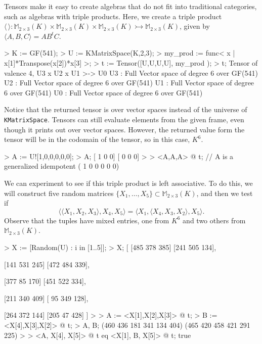 \begin{example}[BBTripleProduct]
Tensors make it easy to create algebras that do not fit into traditional categories, such as algebras with triple products.
Here, we create a triple product $\langle \,\rangle : \mathbb{M}_{2\times 3}(K)\times \mathbb{M}_{2\times 3}(K)\times\mathbb{M}_{2\times 3}(K)\rightarrowtail \mathbb{M}_{2\times 3}(K)$, given by $\langle A, B, C\rangle = AB^tC$.

\begin{code}
> K := GF(541);
> U := KMatrixSpace(K,2,3);
> my_prod := func< x | x[1]*Transpose(x[2])*x[3] >;
> t := Tensor([U,U,U,U], my_prod );
> t;
Tensor of valence 4, U3 x U2 x U1 >-> U0
U3 : Full Vector space of degree 6 over GF(541)
U2 : Full Vector space of degree 6 over GF(541)
U1 : Full Vector space of degree 6 over GF(541)
U0 : Full Vector space of degree 6 over GF(541)
\end{code}

Notice that the returned tensor is over vector spaces instead of the universe of \texttt{KMatrixSpace}.
Tensors can still evaluate elements from the given frame, even though it prints out over vector spaces. 
However, the returned value form the tensor will be in the codomain of the tensor, so in this case, $K^6$.
\begin{code}
> A := U![1,0,0,0,0,0];
> A;
[  1   0   0]
[  0   0   0]
> 
> <A,A,A> @ t;  // A is a generalized idempotent
(  1   0   0   0   0   0)
\end{code}

We can experiment to see if this triple product is left associative.
To do this, we will construct five random matrices $\{ X_1,\dots,X_5\}\subset \mathbb{M}_{2\times 3}(K)$, and then we test if 
\[ \langle \langle X_1, X_2, X_3 \rangle, X_4, X_5\rangle = \langle X_1, \langle X_4, X_3, X_2\rangle, X_5\rangle. \]
Observe that the tuples have mixed entries, one from $K^6$ and two others from $\mathbb{M}_{2\times 3}(K)$. 

\begin{code}
> X := [Random(U) : i  in [1..5]];
> X;
[
    [485 378 385]
    [241 505 134],

    [141 531 245]
    [472 484 339],

    [377  85 170]
    [451 522 334],

    [211 340 409]
    [ 95 349 128],

    [264 372 144]
    [205  47 428]
]
> 
> A := <X[1],X[2],X[3]> @ t;
> B := <X[4],X[3],X[2]> @ t;
> A, B;
(460 436 181 341 134 404)
(465 420 458 421 291 225)
> 
> <A, X[4], X[5]> @ t eq <X[1], B, X[5]> @ t;
true
\end{code}


\end{example}
